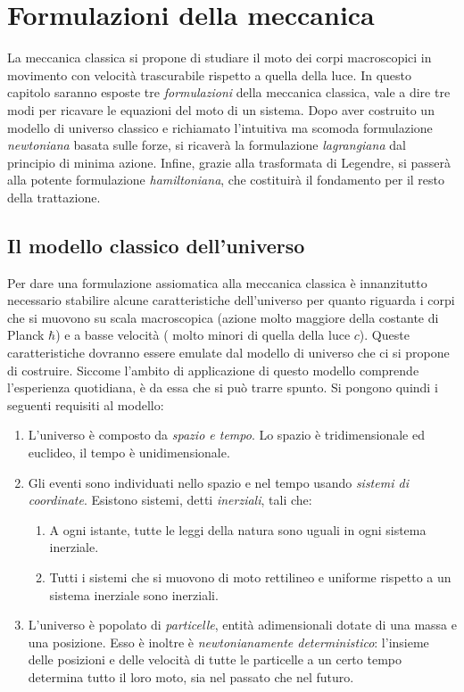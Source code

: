 \chapter{Formulazioni della meccanica}
La meccanica classica si propone di studiare il moto dei corpi macroscopici in movimento con velocità trascurabile rispetto a quella della luce. In questo capitolo saranno esposte tre \emph{formulazioni} della meccanica classica, vale a dire tre modi per ricavare le equazioni del moto di un sistema. Dopo aver costruito un modello di universo classico e richiamato l'intuitiva ma scomoda formulazione \emph{newtoniana} basata sulle forze, si ricaverà la formulazione \emph{lagrangiana} dal principio di minima azione. Infine, grazie alla trasformata di Legendre, si passerà alla potente formulazione \emph{hamiltoniana}, che costituirà il fondamento per il resto della trattazione.

\section{Il modello classico dell'universo}
Per dare una formulazione assiomatica alla meccanica classica è innanzitutto necessario stabilire alcune caratteristiche dell'universo per quanto riguarda i corpi che si muovono su scala macroscopica (azione molto maggiore della costante di Planck $\hbar$) e a basse velocità ( molto minori di quella della luce $c$). Queste caratteristiche dovranno essere emulate dal modello di universo che ci si propone di costruire. Siccome l'ambito di applicazione di questo modello comprende l'esperienza quotidiana, è da essa che si può trarre spunto. Si pongono quindi i seguenti requisiti al modello:
\begin{enumerate}
  \item L'universo è composto da \emph{spazio e tempo}. Lo spazio è tridimensionale ed euclideo, il tempo è unidimensionale.
  \item  Gli eventi sono individuati nello spazio e nel tempo usando \emph{sistemi di coordinate}. Esistono sistemi, detti \emph{inerziali}, tali che:
  \begin{enumerate}
    \item A ogni istante, tutte le leggi della natura sono uguali in ogni sistema inerziale.
    \item Tutti i sistemi che si muovono di moto rettilineo e uniforme rispetto a un sistema inerziale sono inerziali.
  \end{enumerate}
  \item L'universo è popolato di \emph{particelle}, entità adimensionali dotate di una massa e una posizione. Esso è inoltre è \emph{newtonianamente deterministico}: l'insieme delle posizioni e delle velocità di tutte le particelle a un certo tempo determina tutto il loro moto, sia nel passato che nel futuro.
\end{enumerate}


